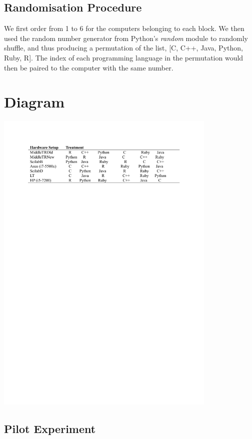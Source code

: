 \documentclass[12pt,halfline,a4paper,]{ouparticle}
\begin{document}
\hypertarget{randomisation-procedure}{%
\subsection{Randomisation Procedure}\label{randomisation-procedure}}

We first order from 1 to 6 for the computers belonging to each block. We
then used the random number generator from Python's \emph{random} module
to randomly shuffle, and thus producing a permutation of the list, {[}C,
C++, Java, Python, Ruby, R{]}. The index of each programming language in
the permutation would then be paired to the computer with the same
number.

\hypertarget{diagram}{%
\section{Diagram}\label{diagram}}

\includegraphics[width=400px]{diagram}

\hypertarget{pilot-experiment}{%
\subsection{Pilot Experiment}\label{pilot-experiment}}
\end{document}

